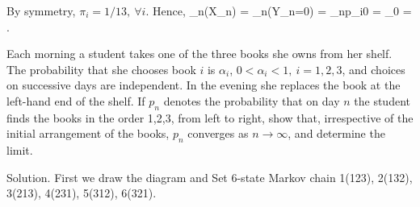 By symmetry, $\pi_i=1/13,\ \forall i$. Hence,
\be
\lim_{n\to\infty}\pro(X_n) = \lim_{n\to\infty}\pro(Y_n=0) = \lim_{n\to\infty}p_{i0} = \pi_0 = .
\ee

\begin{exercise}
Each morning a student takes one of the three books she owns from her shelf. The probability that she chooses book $i$ is $\alpha_i$, $0<\alpha_i<1,\ i=1,2,3$, and choices on successive days are independent. In the evening she replaces the book at the left-hand end of the shelf. If $p_n$ denotes the probability that on day $n$ the student finds the books in the order 1,2,3, from left to right, show that, irrespective of the initial arrangement of the books, $p_n$ converges as $n\to \infty$, and determine the limit.
\end{exercise}

Solution. First we draw the diagram and Set 6-state Markov chain 1(123), 2(132), 3(213), 4(231), 5(312), 6(321).

